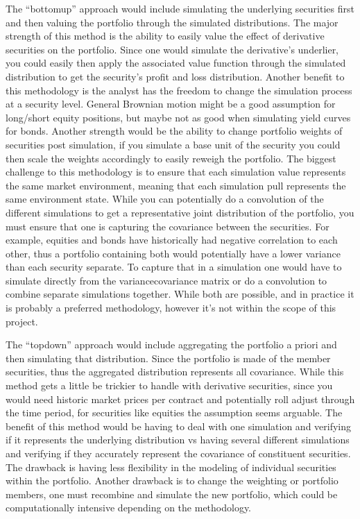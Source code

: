 \documentclass[letterpaper,10pt,english]{sphinxmanual}
\begin{document}
\sphinxAtStartPar
The “bottom\sphinxhyphen{}up” approach would include simulating the underlying
securities first and then valuing the portfolio through the simulated
distributions. The major strength of this method is the ability to
easily value the effect of derivative securities on the portfolio. Since
one would simulate the derivative’s underlier, you could easily then
apply the associated value function through the simulated distribution
to get the security’s profit and loss distribution. Another benefit to
this methodology is the analyst has the freedom to change the simulation
process at a security level. General Brownian motion might be a good
assumption for long/short equity positions, but maybe not as good when
simulating yield curves for bonds. Another strength would be the ability
to change portfolio weights of securities post simulation, if you
simulate a base unit of the security you could then scale the weights
accordingly to easily reweigh the portfolio. The biggest challenge to
this methodology is to ensure that each simulation value represents the
same market environment, meaning that each simulation pull represents
the same environment state. While you can potentially do a convolution
of the different simulations to get a representative joint distribution
of the portfolio, you must ensure that one is capturing the covariance
between the securities. For example, equities and bonds have
historically had negative correlation to each other, thus a portfolio
containing both would potentially have a lower variance than each
security separate. To capture that in a simulation one would have to
simulate directly from the variance\sphinxhyphen{}covariance matrix or do a
convolution to combine separate simulations together. While both are
possible, and in practice it is probably a preferred methodology,
however it’s not within the scope of this project.

\sphinxAtStartPar
The “top\sphinxhyphen{}down” approach would include aggregating the portfolio a priori
and then simulating that distribution. Since the portfolio is made of
the member securities, thus the aggregated distribution represents all
covariance. While this method gets a little be trickier to handle with
derivative securities, since you would need historic market prices per
contract and potentially roll adjust through the time period, for
securities like equities the assumption seems arguable. The benefit of
this method would be having to deal with one simulation and verifying if
it represents the underlying distribution vs having several different
simulations and verifying if they accurately represent the covariance of
constituent securities. The drawback is having less flexibility in the
modeling of individual securities within the portfolio. Another drawback
is to change the weighting or portfolio members, one must recombine and
simulate the new portfolio, which could be computationally intensive
depending on the methodology.
\end{document}
